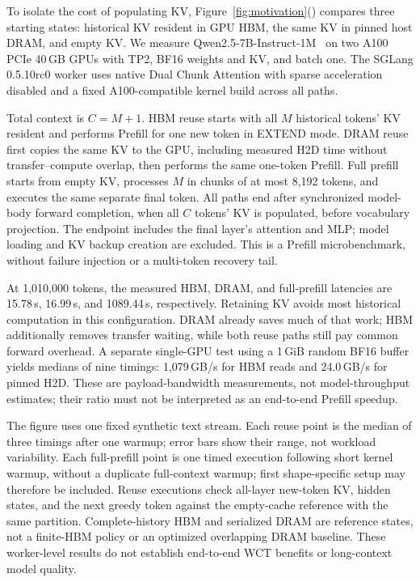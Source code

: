 To isolate the cost of populating KV,
Figure~\ref{fig:motivation}() compares
three starting states: historical KV resident in GPU HBM, the same KV
in pinned host DRAM, and empty KV. We measure
Qwen2.5-7B-Instruct-1M~\cite{qwen2025qwen25oneM} on two A100 PCIe
40\,GB GPUs with TP2, BF16 weights and KV, and batch one. The SGLang
0.5.10rc0 worker uses native Dual Chunk Attention with sparse acceleration
disabled and a fixed A100-compatible kernel build across all paths.

Total context is $C=M+1$. HBM reuse starts with all $M$ historical tokens'
KV resident and performs Prefill for one new token in EXTEND mode.
DRAM reuse first copies the same KV to the GPU, including measured H2D
time without transfer--compute overlap, then performs the same one-token
Prefill. Full prefill starts from empty KV, processes $M$ in chunks of
at most 8,192 tokens, and executes the same separate final token. All
paths end after synchronized model-body forward completion, when all
$C$ tokens' KV is populated, before vocabulary projection. The endpoint
includes the final layer's attention and MLP; model loading and KV backup
creation are excluded. This is a Prefill microbenchmark, without failure
injection or a multi-token recovery tail.

At 1,010,000 tokens, the measured HBM, DRAM, and full-prefill latencies
are 15.78\,s, 16.99\,s, and 1089.44\,s, respectively.
Retaining KV avoids most historical computation in this configuration.
DRAM already saves much of that work; HBM additionally removes transfer
waiting, while both reuse paths still pay common forward overhead.
A separate single-GPU test using a 1\,GiB random BF16 buffer yields medians of nine
timings: 1,079\,GB/s for HBM reads and 24.0\,GB/s for pinned H2D. These are
payload-bandwidth measurements, not model-throughput estimates; their
ratio must not be interpreted as an end-to-end Prefill speedup.

The figure uses one fixed synthetic text stream. Each reuse point is the
median of three timings after one warmup; error bars show their range,
not workload variability. Each full-prefill point is one timed execution
following short kernel warmup, without a duplicate full-context warmup;
first shape-specific setup may therefore be included. Reuse executions
check all-layer new-token KV, hidden states, and the next greedy token
against the empty-cache reference with the same partition. Complete-history
HBM and serialized DRAM are reference states, not a finite-HBM policy or
an optimized overlapping DRAM baseline. These worker-level results do not
establish end-to-end WCT benefits or long-context model quality.

